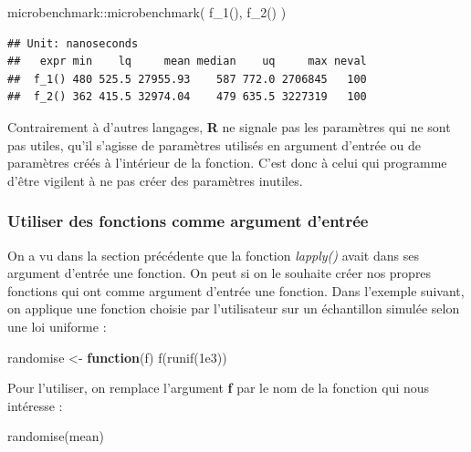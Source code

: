 \documentclass[
]{book}
\newenvironment{Shaded}{\begin{snugshade}}{\end{snugshade}}
\newcommand{\ControlFlowTok}[1]{\textcolor[rgb]{0.13,0.29,0.53}{\textbf{#1}}}
\newcommand{\FloatTok}[1]{\textcolor[rgb]{0.00,0.00,0.81}{#1}}
\newcommand{\FunctionTok}[1]{\textcolor[rgb]{0.00,0.00,0.00}{#1}}
\newcommand{\NormalTok}[1]{#1}
\newcommand{\OtherTok}[1]{\textcolor[rgb]{0.56,0.35,0.01}{#1}}
\newcommand{\SpecialCharTok}[1]{\textcolor[rgb]{0.00,0.00,0.00}{#1}}
\theoremstyle{definition}
\theoremstyle{definition}
\theoremstyle{definition}
\theoremstyle{definition}
\theoremstyle{remark}
\begin{document}
\begin{Shaded}
\begin{Highlighting}[]
\NormalTok{microbenchmark}\SpecialCharTok{::}\FunctionTok{microbenchmark}\NormalTok{(}
  \FunctionTok{f\_1}\NormalTok{(),}
  \FunctionTok{f\_2}\NormalTok{()}
\NormalTok{)}
\end{Highlighting}
\end{Shaded}

\begin{verbatim}
## Unit: nanoseconds
##   expr min    lq     mean median    uq     max neval
##  f_1() 480 525.5 27955.93    587 772.0 2706845   100
##  f_2() 362 415.5 32974.04    479 635.5 3227319   100
\end{verbatim}

Contrairement à d'autres langages, \textbf{R} ne signale pas les paramètres qui ne sont pas utiles, qu'il s'agisse de paramètres utilisés en argument d'entrée ou de paramètres créés à l'intérieur de la fonction. C'est donc à celui qui programme d'être vigilent à ne pas créer des paramètres inutiles.

\hypertarget{utiliser-des-fonctions-comme-argument-dentruxe9e}{%
\subsubsection{Utiliser des fonctions comme argument d'entrée}\label{utiliser-des-fonctions-comme-argument-dentruxe9e}}

On a vu dans la section précédente que la fonction \emph{lapply()} avait dans ses argument d'entrée une fonction. On peut si on le souhaite créer nos propres fonctions qui ont comme argument d'entrée une fonction. Dans l'exemple suivant, on applique une fonction choisie par l'utilisateur sur un échantillon simulée selon une loi uniforme :

\begin{Shaded}
\begin{Highlighting}[]
\NormalTok{randomise }\OtherTok{\textless{}{-}} \ControlFlowTok{function}\NormalTok{(f) }\FunctionTok{f}\NormalTok{(}\FunctionTok{runif}\NormalTok{(}\FloatTok{1e3}\NormalTok{))}
\end{Highlighting}
\end{Shaded}

Pour l'utiliser, on remplace l'argument \textbf{f} par le nom de la fonction qui nous intéresse :

\begin{Shaded}
\begin{Highlighting}[]
\FunctionTok{randomise}\NormalTok{(mean)}
\end{Highlighting}
\end{Shaded}
\end{document}
